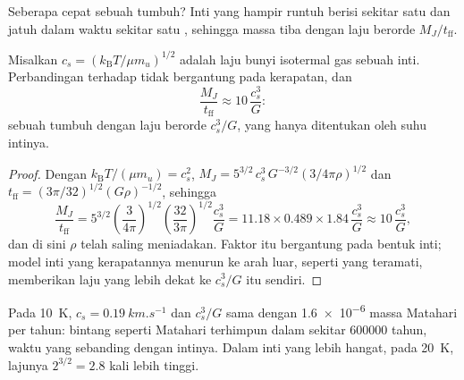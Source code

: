 Seberapa cepat sebuah  tumbuh? Inti yang hampir runtuh berisi sekitar satu
 dan jatuh dalam waktu sekitar satu , sehingga massa tiba
dengan laju berorde $M_J/t_{\mathrm{ff}}$.

\begin{proposition}
\label{prop:b2:ism-star-formation:accretion}
Misalkan $c_s = (k_{\mathrm B}T/\mu m_u)^{1/2}$ adalah laju bunyi isotermal
gas sebuah inti. Perbandingan  terhadap  tidak
bergantung pada kerapatan, dan
\[
  \frac{M_J}{t_{\mathrm{ff}}} \approx 10\,\frac{c_s^3}{G}:
\]
sebuah  tumbuh dengan laju berorde $c_s^3/G$, yang hanya ditentukan oleh suhu
intinya.
\end{proposition}

\begin{proof}
Dengan $k_{\mathrm B}T/(\mu m_u) = c_s^2$, $M_J = 5^{3/2}\,c_s^3\,G^{-3/2}
(3/4\pi\rho)^{1/2}$ dan $t_{\mathrm{ff}} = (3\pi/32)^{1/2}(G\rho)^{-1/2}$, sehingga
\[
  \frac{M_J}{t_{\mathrm{ff}}} = 5^{3/2}\left(\frac{3}{4\pi}\right)^{1/2}
  \left(\frac{32}{3\pi}\right)^{1/2}\frac{c_s^3}{G}
  = 11.18\times0.489\times1.84\,\frac{c_s^3}{G} \approx 10\,\frac{c_s^3}{G},
\]
dan di sini $\rho$ telah saling meniadakan. Faktor itu bergantung pada bentuk inti;
model inti yang kerapatannya menurun ke arah luar, seperti yang teramati, memberikan laju
yang lebih dekat ke $c_s^3/G$ itu sendiri.
\end{proof}

Pada \qty{10}{K}, $c_s = \qty{0.19}{km.s^{-1}}$ dan $c_s^3/G$ sama dengan
\num{1.6e-6} massa Matahari per tahun: bintang seperti Matahari terhimpun dalam sekitar
\num{600000} tahun, waktu yang sebanding dengan  intinya.
Dalam inti yang lebih hangat, pada \qty{20}{K}, lajunya $2^{3/2} = 2.8$ kali lebih tinggi.

